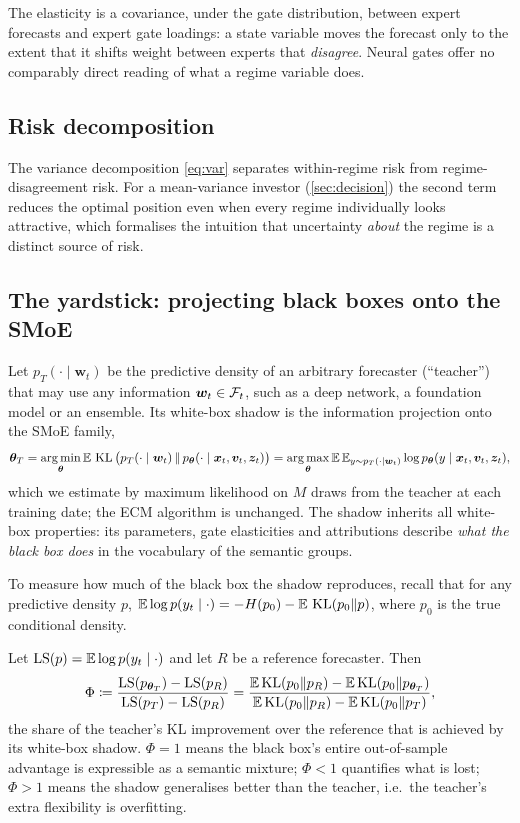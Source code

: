 \noindent The elasticity is a covariance, under the gate distribution, between expert forecasts and
expert gate loadings: a state variable moves the forecast only to the extent that it shifts weight
between experts that \emph{disagree}. Neural gates offer no comparably direct reading of what a
regime variable does.

\subsection{Risk decomposition}

The variance decomposition \eqref{eq:var} separates within-regime risk from regime-disagreement
risk. For a mean-variance investor (\cref{sec:decision}) the second term reduces the optimal position
even when every regime individually looks attractive, which formalises the intuition that
uncertainty \emph{about} the regime is a distinct source of risk.

\subsection{The yardstick: projecting black boxes onto the SMoE}

Let $p_T(\cdot\mid\bm w_t)$ be the predictive density of an arbitrary forecaster (``teacher'') that
may use any information $\bm w_t\in\mathcal{F}_t$, such as a deep network, a foundation model or an ensemble. Its
white-box shadow is the information projection onto the SMoE family,
\begin{equation}\label{eq:projection}
  \bm{\theta}_T=\operatorname*{arg\,min}_{\bm{\theta}}\mathbb{E}\,\operatorname{KL}\big(p_T(\cdot\mid\bm w_t)\,\|\,p_{\bm{\theta}}(\cdot\mid\bm{x}_t,\bm{v}_t,\bm{z}_t)\big)
  =\operatorname*{arg\,max}_{\bm{\theta}}\mathbb{E}\,\mathbb{E}_{y\sim p_T(\cdot\mid\bm w_t)}\log p_{\bm{\theta}}(y\mid\bm{x}_t,\bm{v}_t,\bm{z}_t),
\end{equation}
which we estimate by maximum likelihood on $M$ draws from the teacher at each training date; the
ECM algorithm is unchanged. The shadow inherits all white-box properties: its parameters, gate
elasticities and attributions describe \emph{what the black box does} in the vocabulary of the
semantic groups.

To measure how much of the black box the shadow reproduces, recall that for any predictive density
$p$, $\mathbb{E}\log p(y_t\mid\cdot)=-H(p_0)-\mathbb{E}\,\operatorname{KL}(p_0\|p)$, where $p_0$ is the true conditional density.

\begin{proposition}[Fidelity]\label{prop:fidelity}
Let $\mathrm{LS}(p)=\mathbb{E}\log p(y_t\mid\cdot)$ and let $R$ be a reference forecaster. Then
\begin{equation}
  \Phi\coloneqq\frac{\mathrm{LS}(p_{\bm{\theta}_T})-\mathrm{LS}(p_R)}{\mathrm{LS}(p_T)-\mathrm{LS}(p_R)}
  =\frac{\mathbb{E}\operatorname{KL}(p_0\|p_R)-\mathbb{E}\operatorname{KL}(p_0\|p_{\bm{\theta}_T})}{\mathbb{E}\operatorname{KL}(p_0\|p_R)-\mathbb{E}\operatorname{KL}(p_0\|p_T)} ,
\end{equation}
the share of the teacher's KL improvement over the reference that is achieved by its white-box
shadow. $\Phi=1$ means the black box's entire out-of-sample advantage is expressible as a semantic
mixture; $\Phi<1$ quantifies what is lost; $\Phi>1$ means the shadow generalises better than the
teacher, i.e.\ the teacher's extra flexibility is overfitting.
\end{proposition}

